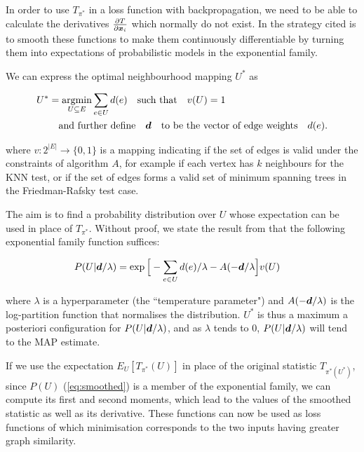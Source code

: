 In order to use $T_{\pi^*}$ in a loss function with backpropagation, we need to be able to calculate the derivatives $\frac{\partial T}{\partial \boldsymbol{x}_i}$ which normally do not exist. In \cite{torchtwosample} the strategy cited is to smooth these functions to make them continuously differentiable by turning them into expectations of probabilistic models in the exponential family. 

We can express the optimal neighbourhood mapping $U^*$ as 

\begin{equation}
\begin{split}
U^* &= \underset{U \subseteq E}{\operatorname{argmin}} \sum_{e \in U} d(e) \quad \text{such that} \quad v(U) = 1 \\
&\quad \text{and further define} \quad \boldsymbol{d} \quad \text{to be the vector of edge weights} \quad d(e). 
\end{split}
\end{equation}

where $v: 2^{|E|} \rightarrow \{0, 1 \}$ is a mapping indicating if the set of edges is valid under the constraints of algorithm $A$, for example if each vertex has $k$ neighbours for the KNN test, or if the set of edges forms a valid set of minimum spanning trees in the Friedman-Rafsky test case. 

The aim is to find a probability distribution over $U$ whose expectation can be used in place of $T_{\pi^*}$. Without proof, we state the result from \cite{torchtwosample} that the following exponential family function suffices:

\begin{equation}
\label{eq:smoothed}
\begin{split}
P(U | \boldsymbol{d} / \lambda) &= \exp\Big[-\sum_{e \in U} d(e) / \lambda - A(-\boldsymbol{d} / \lambda \Big] v(U)
\end{split}
\end{equation}

where $\lambda$ is a hyperparameter (the ``temperature parameter") and $A(-\boldsymbol{d} / \lambda)$ is the log-partition function  that normalises the distribution. $U^*$ is thus a maximum a posteriori configuration for $P(U | \boldsymbol{d}/\lambda)$, and as $\lambda$ tends to 0,  $P(U | \boldsymbol{d}/\lambda)$ will tend to the MAP estimate. 

If we use the expectation $E_{U}[T_{\pi^*}(U)]$ in place of the original statistic $T_{\pi^*(U^*)}$, since $P(U)$ (\ref{eq:smoothed}) is a member of the exponential family, we can compute its first and second moments, which lead to the values of the smoothed statistic as well as its derivative. These functions can now be used as loss functions of which minimisation corresponds to the two inputs having greater graph similarity. 


